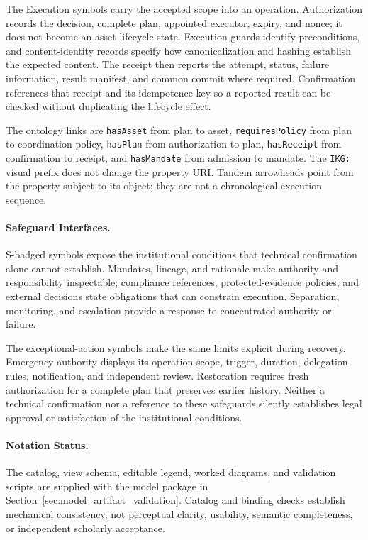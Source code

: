 \documentclass[journal]{IEEEtran}
\begin{document}
The Execution symbols carry the accepted scope into an operation.
Authorization records the decision, complete plan, appointed executor,
expiry, and nonce; it does not become an asset lifecycle state.
Execution guards identify preconditions, and content-identity records
specify how canonicalization and hashing establish the expected content.
The receipt then reports the attempt, status, failure information, result
manifest, and common commit where required. Confirmation references that
receipt and its idempotence key so a reported result can be checked without
duplicating the lifecycle effect.

The ontology links are \texttt{hasAsset} from plan to asset,
\texttt{requiresPolicy} from plan to coordination policy,
\texttt{hasPlan} from authorization to plan,
\texttt{hasReceipt} from confirmation to receipt, and
\texttt{hasMandate} from admission to mandate. The \texttt{IKG:} visual prefix does not change the property URI.
Tandem arrowheads point
from the property subject to its object; they are not a
chronological execution sequence.

\paragraph{Safeguard Interfaces.}
S-badged symbols expose the institutional conditions that technical
confirmation alone cannot establish. Mandates, lineage, and rationale
make authority and responsibility inspectable; compliance references,
protected-evidence policies, and external decisions state obligations
that can constrain execution. Separation, monitoring, and escalation
provide a response to concentrated authority or failure.

The exceptional-action symbols make the same limits explicit during
recovery. Emergency authority displays its operation scope, trigger,
duration, delegation rules, notification, and independent review.
Restoration requires fresh authorization for a complete plan that preserves
earlier history. Neither a technical confirmation nor a reference to these
safeguards silently establishes legal approval or satisfaction of the
institutional conditions.

\paragraph{Notation Status.}
The catalog, view schema, editable legend, worked diagrams,
and validation scripts are supplied with the model package in
Section~\ref{sec:model_artifact_validation}. Catalog and
binding checks establish mechanical consistency, not
perceptual clarity, usability, semantic completeness, or
independent scholarly acceptance.
\end{document}
